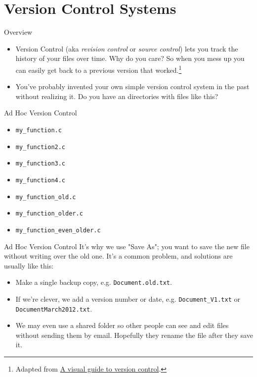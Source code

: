 \section{Version Control Systems}

\begin{frame}{Overview}
\begin{itemize}
\item Version Control (aka \emph{revision control} or \emph{source control})
lets you track the history of your files over time. Why do you care? So
when you mess up you can easily get back to a previous version that
worked.\footnote{Adapted from
\href{http://betterexplained.com/articles/a-visual-guide-to-version-control/}{A
visual guide to version control}.}
\item You've probably invented your own simple version control system in the
past without realizing it. Do you have an directories with files like
this?
\end{itemize}
\end{frame}

\begin{frame}{Ad Hoc Version Control}
\begin{itemize}
\item \texttt{my_function.c}
\item \texttt{my_function2.c}
\item \texttt{my_function3.c}
\item \texttt{my_function4.c}
\item \texttt{my_function_old.c}
\item \texttt{my_function_older.c}
\item \texttt{my_function_even_older.c}
\end{itemize}
\end{frame}


\begin{frame}{Ad Hoc Version Control}
It's why we use "Save As"; you want to save the new file without writing
over the old one. It's a common problem, and solutions are usually like
this:


\begin{itemize}
\item
  Make a single backup copy, e.g. \texttt{Document.old.txt}.
\item
  If we're clever, we add a version number or date, e.g.
  \texttt{Document_V1.txt} or \texttt{DocumentMarch2012.txt}.
\item
  We may even use a shared folder so other people can see and
  edit files without sending them by email. Hopefully they rename the
  file after they save it.
\end{itemize}
\end{frame}




